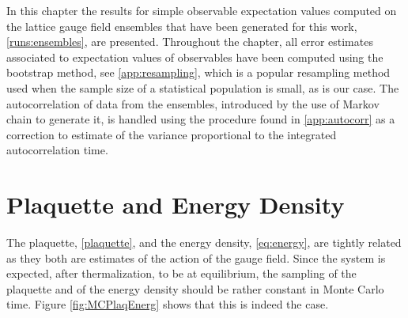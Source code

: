 In this chapter the results for simple observable expectation values computed on the lattice gauge field ensembles that have been generated for this work, \cref{runs:ensembles}, are presented. Throughout the chapter, all error estimates associated to expectation values of observables have been computed using the bootstrap method, see \cref{app:resampling}, which is a popular resampling method used when the sample size of a statistical population is small, as is our case. The autocorrelation of data from the ensembles, introduced by the use of Markov chain to generate it, is handled using the procedure found in \cref{app:autocorr} as a correction to estimate of the variance proportional to the integrated autocorrelation time.

\section{Plaquette and Energy Density} 
The plaquette, \cref{plaquette}, and the energy density, \cref{eq:energy}, are tightly related as they both are estimates of the action of the gauge field.
Since the system is expected, after thermalization, to be at equilibrium, the sampling of the plaquette and of the energy density should be rather constant in Monte Carlo time. Figure \ref{fig:MCPlaqEnerg} shows that this is indeed the case.
